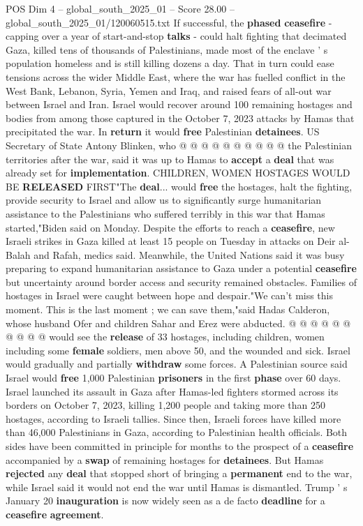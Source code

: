 \begin{textsample}{POS Dim 4 – global\_south\_2025\_01 – Score 28.00 – global\_south\_2025\_01/120060515.txt}
If successful, the \textbf{phased} \textbf{ceasefire} - capping over a year of start-and-stop \textbf{talks} - could halt fighting that decimated Gaza, killed tens of thousands of Palestinians, made most of the enclave ' s population homeless and is still killing dozens a day.
That in turn could ease tensions across the wider Middle East, where the war has fuelled conflict in the West Bank, Lebanon, Syria, Yemen and Iraq, and raised fears of all-out war between Israel and Iran.
Israel would recover around 100 remaining hostages and bodies from among those captured in the October 7, 2023 attacks by Hamas that precipitated the war.
In \textbf{return} it would \textbf{free} Palestinian \textbf{detainees}.
US Secretary of State Antony Blinken, who @ @ @ @ @ @ @ @ @ @ the Palestinian territories after the war, said it was up to Hamas to \textbf{accept} a \textbf{deal} that was already set for \textbf{implementation}.
CHILDREN, WOMEN HOSTAGES WOULD BE \textbf{RELEASED} FIRST"The \textbf{deal}... would \textbf{free} the hostages, halt the fighting, provide security to Israel and allow us to significantly surge humanitarian assistance to the Palestinians who suffered terribly in this war that Hamas started,"Biden said on Monday.
Despite the efforts to reach a \textbf{ceasefire}, new Israeli strikes in Gaza killed at least 15 people on Tuesday in attacks on Deir al-Balah and Rafah, medics said.
Meanwhile, the United Nations said it was busy preparing to expand humanitarian assistance to Gaza under a potential \textbf{ceasefire} but uncertainty around border access and security remained obstacles.
Families of hostages in Israel were caught between hope and despair."We can't miss this moment.
This is the last moment ; we can save them,"said Hadas Calderon, whose husband Ofer and children Sahar and Erez were abducted. @ @ @ @ @ @ @ @ @ @ would see the \textbf{release} of 33 hostages, including children, women including some \textbf{female} soldiers, men above 50, and the wounded and sick.
Israel would gradually and partially \textbf{withdraw} some forces.
A Palestinian source said Israel would \textbf{free} 1,000 Palestinian \textbf{prisoners} in the first \textbf{phase} over 60 days.
Israel launched its assault in Gaza after Hamas-led fighters stormed across its borders on October 7, 2023, killing 1,200 people and taking more than 250 hostages, according to Israeli tallies.
Since then, Israeli forces have killed more than 46,000 Palestinians in Gaza, according to Palestinian health officials.
Both sides have been committed in principle for months to the prospect of a \textbf{ceasefire} accompanied by a \textbf{swap} of remaining hostages for \textbf{detainees}.
But Hamas \textbf{rejected} any \textbf{deal} that stopped short of bringing a \textbf{permanent} end to the war, while Israel said it would not end the war until Hamas is dismantled.
Trump ' s January 20 \textbf{inauguration} is now widely seen as a de facto \textbf{deadline} for a \textbf{ceasefire} \textbf{agreement}.


\end{textsample}
